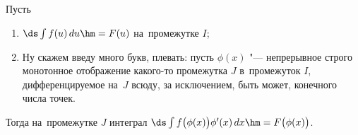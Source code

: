 \label{I1}
	Пусть \begin{enumerate}
	  \item $\ds\int f(u)\,du\hm=F(u)$ на~промежутке $I$;
	  \item Ну скажем введу много букв, плевать: пусть $\phi(x)$ "--- непрерывное строго монотонное отображение какого-то промежутка $J$ в~промежуток
	  $I$, дифференцируемое на~$J$ всюду, за исключением, быть может, конечного числа точек.
	  \end{enumerate} 
	  
	  Тогда на~промежутке $J$ интеграл $\ds\int f\big(\phi(x)\big)\phi'(x)\,dx\hm=F\big(\phi(x)\big)$.  
	
